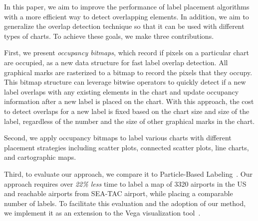 In this paper, we aim to improve the performance of label placement algorithms
with a more efficient way to detect overlapping elements.
In addition, we aim to generalize the overlap detection technique so that it can be used with different types of charts.
To achieve these goals, we make three contributions.

First, we present \emph{occupancy bitmaps}, which record if pixels on a particular chart are occupied, as a new data structure for fast label overlap detection.
All graphical marks are rasterized to a bitmap to record the pixels that they occupy.
This bitmap structure can leverage bitwise operators to quickly detect if a new label overlaps with any existing elements in the chart and update occupancy information after a new label is placed on the chart.
With this approach, the cost to detect overlaps for a new label is fixed based on the chart size and size of the label, regardless of the number and the size of other graphical marks in the chart.

Second, we apply occupancy bitmaps to label various charts with different placement strategies including scatter plots, connected scatter plots, line charts, and cartographic maps.

Third, to evaluate our approach, we compare it to Particle-Based Labeling~\cite{luboschik:particle}.
Our approach requires over \emph{22\% less} time to label a map of 3320 airports in the US and reachable airports from SEA-TAC airport,
while placing a comparable number of labels.
To facilitate this evaluation and the adoption of our method, we implement it as an extension to the Vega visualization tool~\cite{satyanarayan:vega}.
